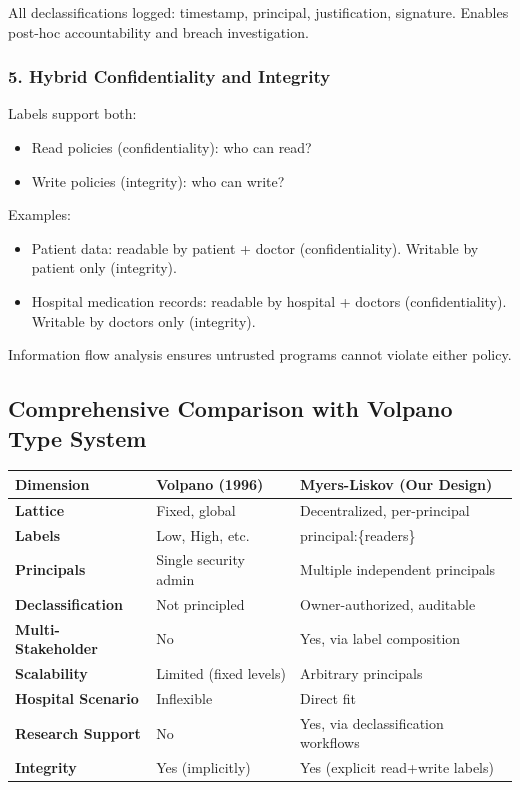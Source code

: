 All declassifications logged: timestamp, principal, justification, signature. Enables post-hoc accountability and breach investigation.

\subsubsection{5. Hybrid Confidentiality and Integrity}

Labels support both:
\begin{itemize}
\item Read policies (confidentiality): who can read?
\item Write policies (integrity): who can write?
\end{itemize}

Examples: 
\begin{itemize}
\item Patient data: readable by patient + doctor (confidentiality). Writable by patient only (integrity).
\item Hospital medication records: readable by hospital + doctors (confidentiality). Writable by doctors only (integrity).
\end{itemize}

Information flow analysis ensures untrusted programs cannot violate either policy.

\subsection{Comprehensive Comparison with Volpano Type System}

\begin{table}[h]
\centering
\begin{tabular}{|l|l|l|}
\hline
\textbf{Dimension} & \textbf{Volpano (1996)} & \textbf{Myers-Liskov (Our Design)} \\
\hline
\textbf{Lattice} & Fixed, global & Decentralized, per-principal \\
\hline
\textbf{Labels} & Low, High, etc. & principal:\{readers\} \\
\hline
\textbf{Principals} & Single security admin & Multiple independent principals \\
\hline
\textbf{Declassification} & Not principled & Owner-authorized, auditable \\
\hline
\textbf{Multi-Stakeholder} & No & Yes, via label composition \\
\hline
\textbf{Scalability} & Limited (fixed levels) & Arbitrary principals \\
\hline
\textbf{Hospital Scenario} & Inflexible & Direct fit \\
\hline
\textbf{Research Support} & No & Yes, via declassification workflows \\
\hline
\textbf{Integrity} & Yes (implicitly) & Yes (explicit read+write labels) \\
\hline
\end{tabular}
\end{table}

